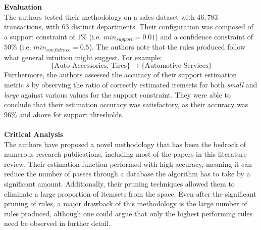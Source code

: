 \\\\\textbf{Evaluation}\\
The authors tested their methodology on a sales dataset with $46,783$ transactions, with $63$ distinct departments. Their configuration was composed of a support constraint of $1\%$ (i.e. $\textit{min}_\textit{support} = 0.01$) and a confidence constraint of $50\%$ (i.e. $\textit{min}_\textit{confidence} = 0.5$). The authors note that the rules produced follow what general intuition might suggest. For example:
\[
\{\text{Auto Accessories, Tires}\} \rightarrow \{\text{Automotive Services}\}
\]
Furthermore, the authors assessed the accuracy of their support estimation metric $\bar{s}$ by observing the ratio of correctly estimated itemsets for both \textit{small} and \textit{large} against various values for the support constraint. They were able to conclude that their estimation accuracy was satisfactory, as their accuracy was  $96\%$ and above for support thresholds.
\\\\\textbf{Critical Analysis}\\
The authors have proposed a novel methodology that has been the bedrock of numerous research publications,  including most of the papers in this literature review.  Their estimation function performed with high accuracy, meaning it can reduce the number of passes through a database the algorithm has to take by a significant amount. Additionally, their pruning techniques allowed them to eliminate a large proportion of itemsets from the space. Even after the significant pruning of rules, a major drawback of this methodology is the large number of rules produced, although one could argue that only the highest performing rules need be observed in further detail.

